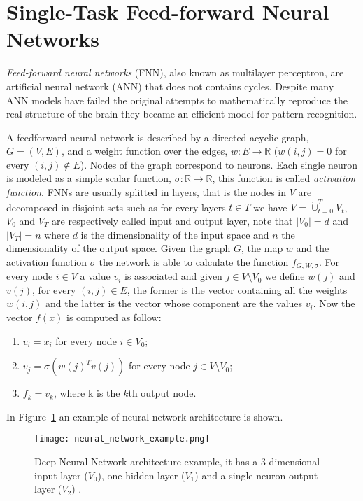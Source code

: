 \section{Single-Task Feed-forward Neural Networks} \label{sec:singletaskNN}
\emph{Feed-forward neural networks} (FNN), also known as multilayer perceptron, are artificial neural network (ANN) that does not contains cycles. Despite many ANN models have failed the original attempts to mathematically reproduce the real structure of the brain they became an efficient model for pattern recognition. 

A feedforward neural network is described by a directed acyclic graph, $G =
(V,E)$, and a weight function over the edges, $w : E \to \mathbb R$ ($w(i, j) = 0$
for every $(i, j) \notin E$). Nodes of the graph correspond to neurons. Each
single neuron is modeled as a simple scalar function, $ \sigma : \mathbb R \to
\mathbb R$, this function is called \emph{activation function}. FNNs are usually
splitted in layers, that is the nodes in $V$ are decomposed in disjoint sets such
as for every layers $t \in T$ we have $V = \dot\cup_{t = 0}^T V_t$, $V_0$ and
$V_T$ are respectively called input and output layer, note that $|V_0| = d$ and
$|V_T| = n$ where $d$ is the dimensionality of the input space and $n$ the
dimensionality of the output space. Given the graph $G$, the map $w$ and the
activation function $\sigma$ the network is able to calculate the function
$f_{G,W,\sigma}$.  For every node $i \in V$ a value $v_i$ is associated and given $j
\in V \setminus V_0$ we define $w(j)$ and $v(j)$, for every $(i, j) \in E$, the
former is the vector containing all the weights $w(i, j)$ and the latter is the
vector whose component are the values $v_i$. Now the vector $f(x)$ is computed as
follow:
\begin{enumerate}
    \item $v_i = x_i$ for every node $i \in V_0$;
    \item $v_j = \sigma(w(j)^T v(j))$ for every node $j \in V \setminus V_0$;
    \item $f_k = v_k$, where k is the $k$th output node.
\end{enumerate}
In Figure~\ref{fig:neural_network_example} an example of neural network architecture is shown. \cite{ShwartzUnderstadningML, BishopML}
\begin{figure}[ht]
\texttt{[image: neural\_network\_example.png]}
\caption{Deep Neural Network architecture example, it has a 3-dimensional input layer ($V_0$), one hidden layer ($V_1$) and a single neuron output layer ($V_2$) \cite{ShwartzUnderstadningML}.} 
\label{fig:neural_network_example}
\end{figure}

